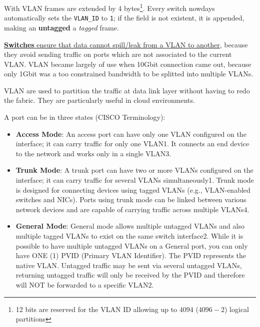 With VLAN frames are extended by 4 bytes\footnote{12 bits are reserved for the VLAN ID allowing up to $4094$ ($4096-2$) logical partitions}. Every switch nowdays automatically sets the \texttt{VLAN\_ID} to \texttt{1}; if the field is not existent, it is appended, making an \textbf{untagged} a \textit{tagged} frame.

\ul{\textbf{Switches} ensure that data cannot spill/leak from a VLAN to another}, because they avoid sending traffic on ports which are not associated to the current VLAN.
VLAN became largely of use when 10Gbit connection came out, because only 1Gbit was a too constrained bandwidth to be splitted into multiple VLANs. 

VLAN are used to partition the traffic at data link layer without having to redo the fabric. They are particularly useful in cloud environments.

A port can be in three states (CISCO Terminology):\ns
\begin{itemize}
   

   \item \textbf{Access Mode}: An access port can have only one VLAN configured on the interface; it can carry traffic for only one VLAN1. It connects an end device to the network and works only in a single VLAN3.

   \item \textbf{Trunk Mode}: A trunk port can have two or more VLANs configured on the interface; it can carry traffic for several VLANs simultaneously1. Trunk mode is designed for connecting devices using tagged VLANs (e.g., VLAN-enabled switches and NICs). Ports using trunk mode can be linked between various network devices and are capable of carrying traffic across multiple VLANs4.

   \item \textbf{General Mode}: General mode allows multiple untagged VLANs and also multiple tagged VLANs to exist on the same switch interface2. While it is possible to have multiple untagged VLANs on a General port, you can only have ONE (1) PVID (Primary VLAN Identifier). The PVID represents the native VLAN. Untagged traffic may be sent via several untagged VLANs, returning untagged traffic will only be received by the PVID and therefore will NOT be forwarded to a specific VLAN2.

   \end{itemize}

